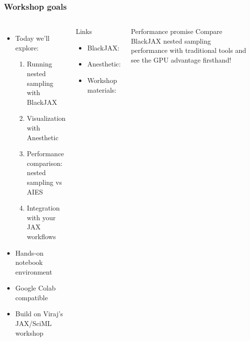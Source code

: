 \documentclass[aspectratio=169]{beamer}
\begin{document}
\begin{frame}
    \frametitle{Workshop goals}
    \begin{columns}
        \begin{itemize}
            \item Today we'll explore:
                \begin{enumerate}
                    \item Running nested sampling with BlackJAX
                    \item Visualization with Anesthetic
                    \item Performance comparison: nested sampling vs AIES
                    \item Integration with your JAX workflows
                \end{enumerate}
            \item Hands-on notebook environment
            \item Google Colab compatible
            \item Build on Viraj's JAX/SciML workshop
        \end{itemize}
        \begin{block}{Links}
            \begin{itemize}
                \item BlackJAX: 
                \item Anesthetic: 
                \item Workshop materials: 
            \end{itemize}
        \end{block}
        \vspace{10pt}
        \begin{alertblock}{Performance promise}
            Compare BlackJAX nested sampling performance with traditional tools and see the GPU advantage firsthand!
        \end{alertblock}
    \end{columns}
\end{frame}
\end{document}
